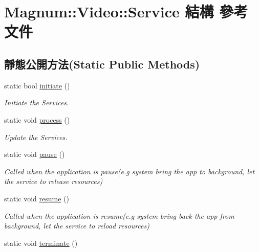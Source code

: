 \hypertarget{struct_magnum_1_1_video_1_1_service}{}\section{Magnum\+:\+:Video\+:\+:Service 結構 參考文件}
\label{struct_magnum_1_1_video_1_1_service}
\subsection*{靜態公開方法(Static Public Methods)}
\begin{DoxyCompactItemize}
\item 
static bool \hyperlink{struct_magnum_1_1_video_1_1_service_af08d7e7475b0776426f2b88a68945595}{initiate} ()
\begin{DoxyCompactList}\small\item\em Initiate the Services. \end{DoxyCompactList}\item 
static void \hyperlink{struct_magnum_1_1_video_1_1_service_ab35b835bcaecc9b07353c4c715ffd1ec}{process} ()\hypertarget{struct_magnum_1_1_video_1_1_service_ab35b835bcaecc9b07353c4c715ffd1ec}{}\label{struct_magnum_1_1_video_1_1_service_ab35b835bcaecc9b07353c4c715ffd1ec}

\begin{DoxyCompactList}\small\item\em Update the Services. \end{DoxyCompactList}\item 
static void \hyperlink{struct_magnum_1_1_video_1_1_service_a01693610f3be5041716ce30be45e300c}{pause} ()\hypertarget{struct_magnum_1_1_video_1_1_service_a01693610f3be5041716ce30be45e300c}{}\label{struct_magnum_1_1_video_1_1_service_a01693610f3be5041716ce30be45e300c}

\begin{DoxyCompactList}\small\item\em Called when the application is pause(e.\+g system bring the app to background, let the service to release resources) \end{DoxyCompactList}\item 
static void \hyperlink{struct_magnum_1_1_video_1_1_service_a024f245c2ca9f9119ab286957950a4e3}{resume} ()\hypertarget{struct_magnum_1_1_video_1_1_service_a024f245c2ca9f9119ab286957950a4e3}{}\label{struct_magnum_1_1_video_1_1_service_a024f245c2ca9f9119ab286957950a4e3}

\begin{DoxyCompactList}\small\item\em Called when the application is resume(e.\+g system bring back the app from background, let the service to reload resources) \end{DoxyCompactList}\item 
static void \hyperlink{struct_magnum_1_1_video_1_1_service_a974419a670a09a2d595f03eb3321c2e3}{terminate} ()\hypertarget{struct_magnum_1_1_video_1_1_service_a974419a670a09a2d595f03eb3321c2e3}{}\label{struct_magnum_1_1_video_1_1_service_a974419a670a09a2d595f03eb3321c2e3}


\end{DoxyCompactItemize}

